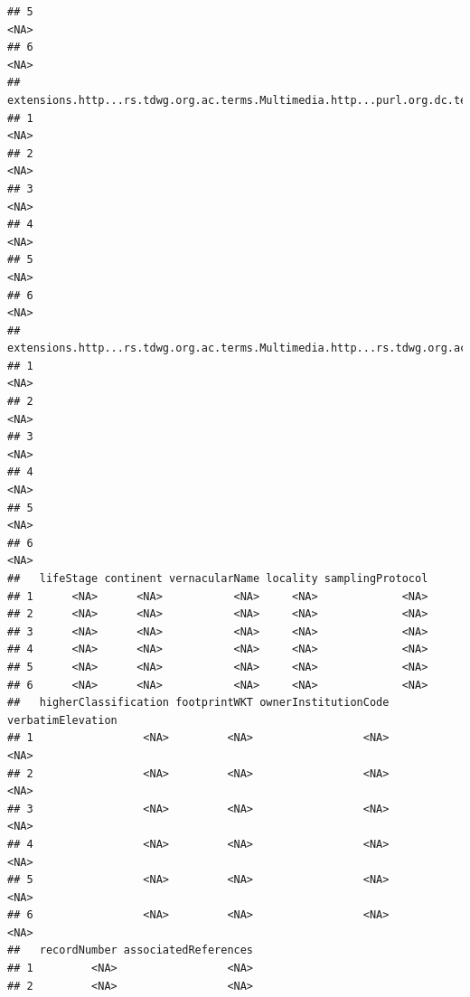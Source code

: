 \documentclass[
]{book}
\begin{document}
\begin{verbatim}
## 5                                                                              <NA>
## 6                                                                              <NA>
##   extensions.http...rs.tdwg.org.ac.terms.Multimedia.http...purl.org.dc.terms.format.2
## 1                                                                                <NA>
## 2                                                                                <NA>
## 3                                                                                <NA>
## 4                                                                                <NA>
## 5                                                                                <NA>
## 6                                                                                <NA>
##   extensions.http...rs.tdwg.org.ac.terms.Multimedia.http...rs.tdwg.org.ac.terms.variantLiteral
## 1                                                                                         <NA>
## 2                                                                                         <NA>
## 3                                                                                         <NA>
## 4                                                                                         <NA>
## 5                                                                                         <NA>
## 6                                                                                         <NA>
##   lifeStage continent vernacularName locality samplingProtocol
## 1      <NA>      <NA>           <NA>     <NA>             <NA>
## 2      <NA>      <NA>           <NA>     <NA>             <NA>
## 3      <NA>      <NA>           <NA>     <NA>             <NA>
## 4      <NA>      <NA>           <NA>     <NA>             <NA>
## 5      <NA>      <NA>           <NA>     <NA>             <NA>
## 6      <NA>      <NA>           <NA>     <NA>             <NA>
##   higherClassification footprintWKT ownerInstitutionCode verbatimElevation
## 1                 <NA>         <NA>                 <NA>              <NA>
## 2                 <NA>         <NA>                 <NA>              <NA>
## 3                 <NA>         <NA>                 <NA>              <NA>
## 4                 <NA>         <NA>                 <NA>              <NA>
## 5                 <NA>         <NA>                 <NA>              <NA>
## 6                 <NA>         <NA>                 <NA>              <NA>
##   recordNumber associatedReferences
## 1         <NA>                 <NA>
## 2         <NA>                 <NA>

\end{verbatim}
\end{document}
